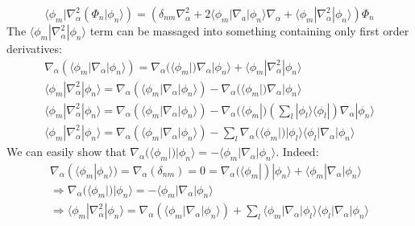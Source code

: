 \documentclass[11pt,a4paper]{article}
\begin{document}
\begin{equation}
	\label{eq:Laplacian expansion}
	\langle\phi_m | \nabla_\alpha^2 (\Phi_n |\phi_n\rangle) = \left( \delta_{nm} \nabla_\alpha^2 + 2\langle\phi_m | \nabla_a | \phi_n\rangle \nabla_\alpha + \langle\phi_m | \nabla_\alpha^2 | \phi_n\rangle \right) \Phi_n
\end{equation}
The $\langle\phi_m | \nabla_\alpha^2 | \phi_n\rangle$ term can be massaged into something containing only first order derivatives:
\begin{equation*}
	\begin{gathered}
		\nabla_\alpha (\langle\phi_m | \nabla_\alpha | \phi_n\rangle) = \nabla_\alpha (\langle\phi_m |) \nabla_\alpha |\phi_n\rangle + \langle\phi_m | \nabla_\alpha^2 | \phi_n\rangle \\[6pt]
		\langle\phi_m | \nabla_\alpha^2 | \phi_n\rangle = \nabla_\alpha (\langle\phi_m | \nabla_\alpha | \phi_n\rangle) - \nabla_\alpha (\langle\phi_m |) \nabla_\alpha |\phi_n\rangle \\[6pt]
		\langle\phi_m | \nabla_\alpha^2 | \phi_n\rangle = \nabla_\alpha (\langle\phi_m | \nabla_\alpha | \phi_n\rangle) - \nabla_\alpha (\langle\phi_m |) \left(\sum_l |\phi_l\rangle \langle\phi_l|\right) \nabla_\alpha |\phi_n\rangle \\[6pt]
		\langle\phi_m | \nabla_\alpha^2 | \phi_n\rangle = \nabla_\alpha (\langle\phi_m | \nabla_\alpha | \phi_n\rangle) - \sum_l \nabla_\alpha (\langle\phi_m |) |\phi_l\rangle \langle\phi_l | \nabla_\alpha | \phi_n\rangle
	\end{gathered}
\end{equation*}
We can easily show that $\nabla_\alpha (\langle\phi_m |) |\phi_n\rangle = -\langle\phi_m | \nabla_\alpha | \phi_n\rangle$. Indeed:
\begin{equation*}
	\begin{gathered}
		\nabla_\alpha (\langle\phi_m | \phi_n\rangle) = \nabla_\alpha (\delta_{nm}) = 0 = \nabla_\alpha (\langle\phi_m |) |\phi_n\rangle + \langle\phi_m | \nabla_\alpha | \phi_n\rangle \\[6pt]
		\Rightarrow \nabla_\alpha (\langle\phi_m |) |\phi_n\rangle = -\langle\phi_m | \nabla_\alpha | \phi_n\rangle \\[6pt]
		\Rightarrow \langle\phi_m | \nabla_\alpha^2 | \phi_n\rangle = \nabla_\alpha (\langle\phi_m | \nabla_\alpha | \phi_n\rangle) + \sum_l \langle\phi_m | \nabla_\alpha | \phi_l\rangle \langle\phi_l | \nabla_\alpha | \phi_n\rangle
	\end{gathered}
\end{equation*}
\end{document}
